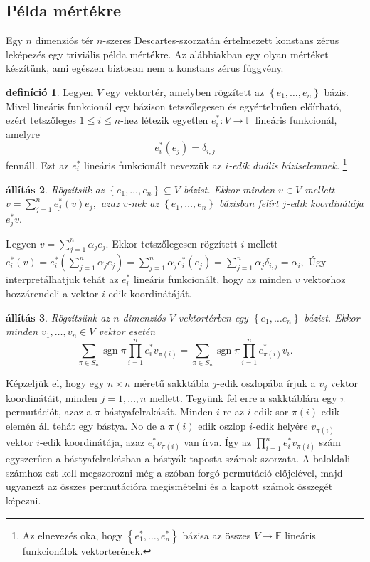 \documentclass[9pt, a4paper, showtrims]{memoir}
\makeatletter
\renewenvironment{proof}[1][\proofname]
    {\par\pushQED{\qed}%
    \normalfont \topsep6\p@\@plus6\p@\relax
    \trivlist
    \item[\hskip\labelsep
        \itshape
    #1\@addpunct{:}]\ignorespaces}
    {\popQED\endtrivlist\@endpefalse}
\theoremstyle{plain}
\newtheorem{proposition}{állítás}[chapter]
\theoremstyle{remark}
\theoremstyle{definition}
\newtheorem{definition}[proposition]{definíció}
\DeclareMathOperator{\sgn}{sgn}
\makeatother
\begin{document}
\subsection{Példa mértékre}
Egy $n$ dimenziós tér $n$-szeres Descartes-szorzatán értelmezett konstans zérus leképezés egy
triviális példa mértékre.
Az alábbiakban egy olyan mértéket készítünk, ami egészen biztosan nem a konstans zérus függvény.
\begin{definition}
    Legyen $V$ egy vektortér, amelyben rögzített az $\left\{ e_1,\dots,e_n \right\}$
    bázis.
    Mivel lineáris funkcionál egy bázison tetszőlegesen és egyértelműen előírható,
    ezért tetszőleges $1\leq i\leq n$-hez létezik egyetlen $e_i^\ast:V\to\mathbb{F}$
    lineáris funkcionál, amelyre
    \[
        e_i^\ast(e_j)=\delta_{i,j}
    \]
    fennáll.
    Ezt az $e_i^\ast$ lineáris funkcionált nevezzük az \emph{$i$-edik duális báziselemnek.}%
    \footnote
    {
        Az elnevezés oka, 
        hogy $\left\{ e_1^\ast,\dots,e_n^\ast \right\}$ bázisa az összes $V\to\mathbb{F}$ lineáris funkcionálok vektorterének.
    }
\end{definition}
\begin{proposition}
    Rögzítsük az $\left\{ e_1,\dots,e_n \right\}\subseteq V$ bázist.
    Ekkor minden $v\in V$ mellett
    \(
        v=\sum_{j=1}^ne_j^\ast(v)e_j,
    \)
    azaz $v$-nek az $\left\{ e_1,\dots,e_n \right\}$ bázisban felírt $j$-edik koordinátája $e_j^\ast v.$
\end{proposition}
\begin{proof}
    Legyen $v=\sum_{j=1}^n\alpha_je_j$.
    Ekkor tetszőlegesen rögzített $i$ mellett
    \(
        e_i^\ast(v)
        =
        e_i^\ast\left( \sum_{j=1}^n\alpha_je_j \right)
        =
        \sum_{j=1}^n\alpha_je_i^\ast\left( e_j \right)
        =
        \sum_{j=1}^n\alpha_j\delta_{i,j}
        =
        \alpha_i,
    \)
\end{proof}
Úgy interpretálhatjuk tehát az $e_i^\ast$ lineáris funkcionált,
hogy az minden $v$ vektorhoz hozzárendeli a vektor $i$-edik koordinátáját.
\begin{proposition}
    Rögzítsünk az $n$-dimenziós $V$ vektortérben egy $\left\{ e_{1},\ldots e_{n}\right\} $ bázist. 
    Ekkor minden $v_1,\dots,v_n\in V$ vektor esetén
    \[
    \sum_{\pi \in S_{n}}\sgn\pi\prod_{i=1}^{n}e_{i}^{\ast }v_{\pi \left( i\right)}
    =
    \sum_{\pi \in S_{n}}\sgn\pi\prod_{i=1}^{n}e_{\pi \left( i\right)}^{\ast }v_{i}.
    \]
\end{proposition}
Képzeljük el, hogy egy $n\times n$ méretű sakktábla $j$-edik oszlopába írjuk a $v_j$ vektor koordinátáit,
minden $j=1,\dots,n$ mellett.
Tegyünk fel erre a sakktáblára egy $\pi$ permutációt, azaz a $\pi$ bástyafelrakását.
Minden $i$-re az $i$-edik sor $\pi\left( i \right)$-edik elemén áll tehát egy bástya.
No de a $\pi\left( i \right)$ edik oszlop $i$-edik helyére $v_{\pi\left( i \right)}$ vektor $i$-edik koordinátája,
azaz $e_i^\ast v_{\pi(i)}$ van írva.
Így az $\prod_{i=1}^n e_i^\ast v_{\pi\left( i \right)}$ szám egyszerűen a bástyafelrakásban a bástyák taposta számok szorzata.
A baloldali számhoz ezt kell megszorozni még a szóban forgó permutáció előjelével, 
majd ugyanezt az összes permutációra megismételni és a kapott számok összegét képezni.
\end{document}
